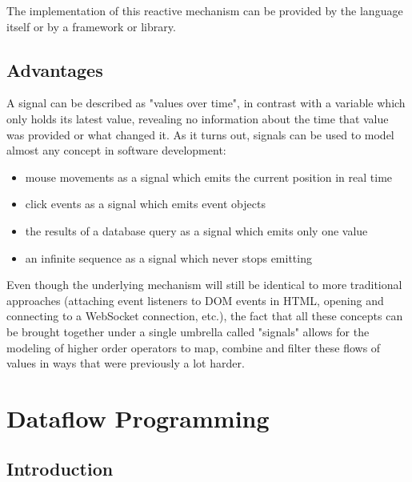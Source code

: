 The implementation of this reactive mechanism can be provided by the language itself or by a framework or library. 

\subsection{Advantages}

A signal can be described as "values over time", in contrast with a variable which only holds its latest value, revealing no information about the time that value was provided or what changed it. 
As it turns out, signals can be used to model almost any concept in software development:
\begin{itemize}
	\item mouse movements as a signal which emits the current position in real time
	\item click events as a signal which emits event objects
	\item the results of a database query as a signal which emits only one value
    \item an infinite sequence as a signal which never stops emitting
\end{itemize}

Even though the underlying mechanism will still be identical to more traditional approaches (attaching event listeners to DOM events in HTML, opening and connecting to a WebSocket connection, etc.), the fact that all these concepts can be brought together under a single umbrella called "signals" allows for the modeling of higher order operators to map, combine and filter these flows of values in ways that were previously a lot harder.

\section{Dataflow Programming}

\subsection{Introduction}

